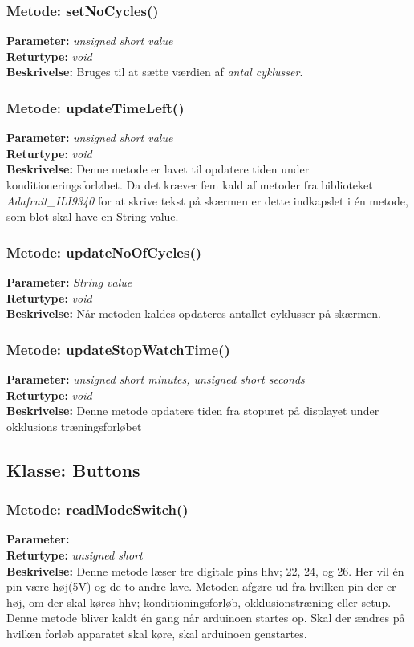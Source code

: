 \subsubsection{Metode: setNoCycles()}
\textbf{Parameter: } \textit{unsigned short value}
\\ \textbf{Returtype: } \textit{void}
\\ \textbf{Beskrivelse: } Bruges til at sætte værdien af \textit{antal cyklusser}. 

\subsubsection{Metode: updateTimeLeft()}
\textbf{Parameter: } \textit{unsigned short value}
\\ \textbf{Returtype: } \textit{void}
\\ \textbf{Beskrivelse: } Denne metode er lavet til opdatere tiden under konditioneringsforløbet. Da det kræver fem kald af metoder fra biblioteket \textit{Adafruit\_ILI9340} for at skrive tekst på skærmen er dette indkapslet i én metode, som blot skal have en String value. 

\subsubsection{Metode: updateNoOfCycles()}
\textbf{Parameter: } \textit{String value}
\\ \textbf{Returtype: } \textit{void}
\\ \textbf{Beskrivelse: } Når metoden kaldes opdateres antallet cyklusser på skærmen. 

\subsubsection{Metode: updateStopWatchTime()}
\textbf{Parameter: } \textit{unsigned short minutes, unsigned short seconds}
\\ \textbf{Returtype: } \textit{void}
\\ \textbf{Beskrivelse: } Denne metode opdatere tiden fra stopuret på displayet under okklusions træningsforløbet 

\subsection{Klasse: Buttons}

\subsubsection{Metode: readModeSwitch()}
\textbf{Parameter: } 
\\ \textbf{Returtype: } \textit{unsigned short}
\\ \textbf{Beskrivelse: } Denne metode læser tre digitale pins hhv; 22, 24, og 26. Her vil én pin være høj(5V) og de to andre lave. Metoden afgøre ud fra hvilken pin der er høj, om der skal køres hhv; konditioningsforløb, okklusionstræning eller setup. Denne metode bliver kaldt én gang når arduinoen startes op. Skal der ændres på hvilken forløb apparatet skal køre, skal arduinoen genstartes. 

